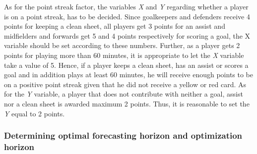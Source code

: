 As for the point streak factor, the variables \textit{X} and \textit{Y} regarding whether a player is on a point streak, has to be decided. Since goalkeepers and defenders receive 4 points for keeping a clean sheet, all players get 3 points for an assist and midfielders and forwards get 5 and 4 points respectively for scoring a goal, the X variable should be set according to these numbers. Further, as a player gets 2 points for playing more than 60 minutes, it is appropriate to let the \textit{X} variable take a value of 5. Hence, if a player keeps a clean sheet, has an assist or scores a goal and in addition plays at least 60 minutes, he will receive enough points to be on a positive point streak given that he did not receive a yellow or red card. As for the \textit{Y} variable, a player that does not contribute with neither a goal, assist nor a clean sheet is awarded maximum 2 points. Thus, it is reasonable to set the \textit{Y} equal to 2 points. 


\subsubsection{Determining optimal forecasting horizon and optimization horizon}

